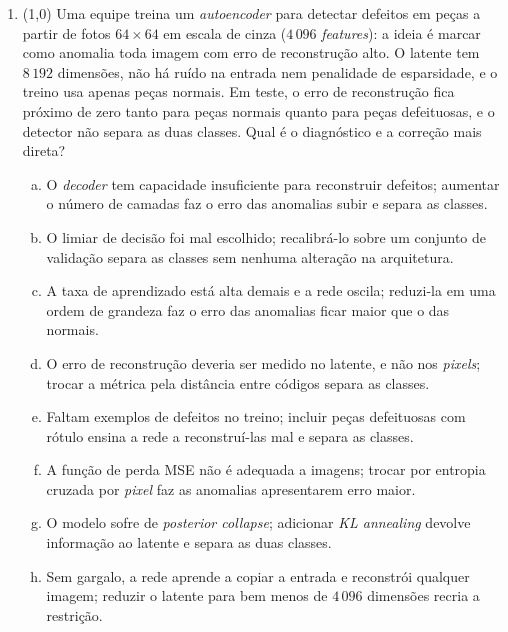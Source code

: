 \documentclass[11pt,a4paper]{article}
\begin{document}
\begin{enumerate}[1)]
\pagebreak
\item (1{,}0) Uma equipe treina um \textit{autoencoder} para detectar defeitos em peças a partir de fotos $64 \times 64$ em escala de cinza ($4\,096$ \textit{features}): a ideia é marcar como anomalia toda imagem com erro de reconstrução alto. O latente tem $8\,192$ dimensões, não há ruído na entrada nem penalidade de esparsidade, e o treino usa apenas peças normais. Em teste, o erro de reconstrução fica próximo de zero tanto para peças normais quanto para peças defeituosas, e o detector não separa as duas classes. Qual é o diagnóstico e a correção mais direta?
\begin{enumerate}[a)]
    \item O \textit{decoder} tem capacidade insuficiente para reconstruir defeitos; aumentar o número de camadas faz o erro das anomalias subir e separa as classes.
    \item O limiar de decisão foi mal escolhido; recalibrá-lo sobre um conjunto de validação separa as classes sem nenhuma alteração na arquitetura.
    \item A taxa de aprendizado está alta demais e a rede oscila; reduzi-la em uma ordem de grandeza faz o erro das anomalias ficar maior que o das normais.
    \item O erro de reconstrução deveria ser medido no latente, e não nos \textit{pixels}; trocar a métrica pela distância entre códigos separa as classes.
    \item Faltam exemplos de defeitos no treino; incluir peças defeituosas com rótulo ensina a rede a reconstruí-las mal e separa as classes.
    \item A função de perda MSE não é adequada a imagens; trocar por entropia cruzada por \textit{pixel} faz as anomalias apresentarem erro maior.
    \item O modelo sofre de \textit{posterior collapse}; adicionar \textit{KL annealing} devolve informação ao latente e separa as duas classes.
    \item Sem gargalo, a rede aprende a copiar a entrada e reconstrói qualquer imagem; reduzir o latente para bem menos de $4\,096$ dimensões recria a restrição.
\end{enumerate}


\end{enumerate}
\end{document}
